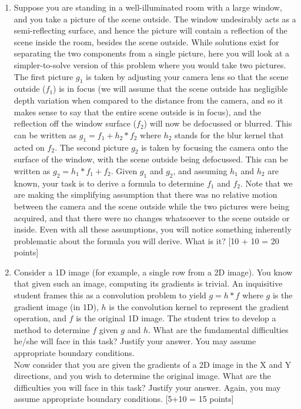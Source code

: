 \documentclass[11pt]{article}
\begin{document}
\begin{enumerate}
\item Suppose you are standing in a well-illuminated room with a large window, and you take a picture of the scene outside. The window undesirably acts as a semi-reflecting surface, and hence the picture will contain a reflection of the scene inside the room, besides the scene outside. While solutions exist for separating the two components from a single picture, here you will look at a simpler-to-solve version of this problem where you would take two pictures. The first picture $g_1$ is taken by adjusting your camera lens so that the scene outside ($f_1$) is in focus (we will assume that the scene outside has negligible depth variation when compared to the distance from the camera, and so it makes sense to say that the entire scene outside is in focus), and the reflection off the window surface ($f_2$) will now be defocussed or blurred.  This can be written as $g_1 = f_1 + h_2 * f_2$ where $h_2$ stands for the blur kernel that acted on $f_2$. The second picture $g_2$ is taken by focusing the camera onto the surface of the window, with the scene outside being defocussed. This can be written as $g_2 = h_1 * f_1 + f_2$. Given $g_1$ and $g_2$, and assuming $h_1$ and $h_2$ are known, your task is to derive a formula to determine $f_1$ and $f_2$. Note that we are making the simplifying assumption that there was no relative motion between the camera and the scene outside while the two pictures were being acquired, and that there were no changes whatsoever to the scene outside or inside. Even with all these assumptions, you will notice something inherently problematic about the formula you will derive. What is it? \textsf[10 + 10  = 20 points]

\item Consider a 1D image (for example, a single row from a 2D image). You know that given such an image, computing its gradients is trivial. An inquisitive student frames this as a convolution problem to yield $g = h*f$ where $g$ is the gradient image (in 1D), $h$ is the convolution kernel to represent the gradient operation, and $f$ is the original 1D image. The student tries to develop a method to determine $f$ given $g$ and $h$. What are the fundamental difficulties he/she will face in this task? Justify your answer. You may assume appropriate boundary conditions.
\\
Now consider that you are given the gradients of a 2D image in the X and Y directions, and you wish to determine the original image. What are the difficulties you will face in this task? Justify your answer. Again, you may assume appropriate boundary conditions. \textsf{[5+10 = 15 points]}




\end{enumerate}
\end{document}
